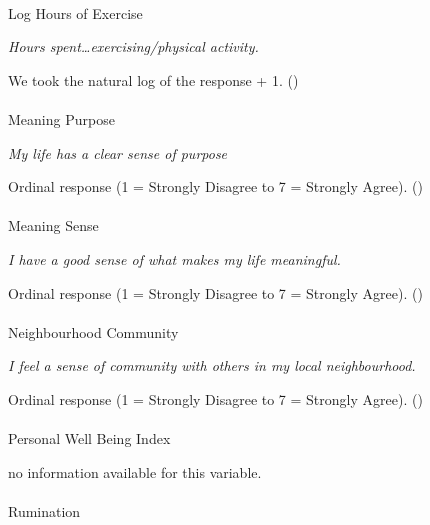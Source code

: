\documentclass[
  single column]{article}
\makeatletter
\let\oldparagraph\paragraph
\renewcommand{\paragraph}{
    \@ifstar
      \xxxParagraphStar
      \xxxParagraphNoStar
  }
\newcommand{\xxxParagraphStar}[1]{\oldparagraph*{#1}\mbox{}}
\newcommand{\xxxParagraphNoStar}[1]{\oldparagraph{#1}\mbox{}}
\makeatother
\begin{document}
\paragraph{Log Hours of Exercise}\label{log-hours-of-exercise-1}

\emph{Hours spent\ldots exercising/physical activity.}

We took the natural log of the response + 1.
()

\paragraph{Meaning Purpose}\label{meaning-purpose}

\emph{My life has a clear sense of purpose}

Ordinal response (1 = Strongly Disagree to 7 = Strongly Agree).
()

\paragraph{Meaning Sense}\label{meaning-sense}

\emph{I have a good sense of what makes my life meaningful.}

Ordinal response (1 = Strongly Disagree to 7 = Strongly Agree).
()

\paragraph{Neighbourhood Community}\label{neighbourhood-community}

\emph{I feel a sense of community with others in my local
neighbourhood.}

Ordinal response (1 = Strongly Disagree to 7 = Strongly Agree).
()

\paragraph{Personal Well Being Index}\label{personal-well-being-index}

no information available for this variable.

\paragraph{Rumination}\label{rumination}
\end{document}
